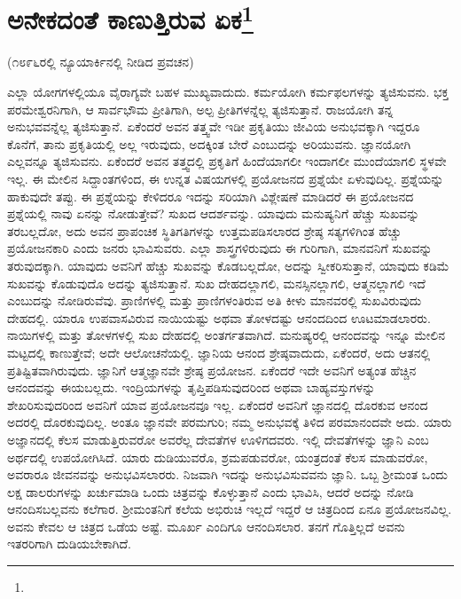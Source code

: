 
\chapter{ಅನೇಕದಂತೆ ಕಾಣುತ್ತಿರುವ ಏಕ\protect\footnote{}}

\begin{center}
(೧೮೯೬ರಲ್ಲಿ ನ್ಯೂಯಾರ್ಕಿನಲ್ಲಿ ನೀಡಿದ ಪ್ರವಚನ)
\end{center}

ಎಲ್ಲಾ ಯೋಗಗಳಲ್ಲಿಯೂ ವೈರಾಗ್ಯವೇ ಬಹಳ ಮುಖ್ಯವಾದುದು. ಕರ್ಮಯೋಗಿ ಕರ್ಮಫಲಗಳನ್ನು ತ್ಯಜಿಸುವನು. ಭಕ್ತ ಪರಮೇಶ್ವರನಿಗಾಗಿ, ಆ ಸಾರ್ವಭೌಮ ಪ್ರೀತಿಗಾಗಿ, ಅಲ್ಪ ಪ್ರೀತಿಗಳನ್ನೆಲ್ಲ ತ್ಯಜಿಸುತ್ತಾನೆ. ರಾಜಯೋಗಿ ತನ್ನ ಅನುಭವವನ್ನೆಲ್ಲ ತ್ಯಜಿಸುತ್ತಾನೆ. ಏಕೆಂದರೆ ಅವನ ತತ್ತ್ವವೇ ಇಡೀ ಪ್ರಕೃತಿಯು ಜೀವಿಯ ಅನುಭವಕ್ಕಾಗಿ ಇದ್ದರೂ ಕೊನೆಗೆ, ತಾನು ಪ್ರಕೃತಿಯಲ್ಲಿ ಅಲ್ಲ ಇರುವುದು, ಅದಕ್ಕಿಂತ ಬೇರೆ ಎಂಬುದನ್ನು ಅರಿಯುವನು. ಜ್ಞಾನಯೋಗಿ ಎಲ್ಲವನ್ನೂ ತ್ಯಜಿಸುವನು. ಏಕೆಂದರೆ ಅವನ ತತ್ತ್ವದಲ್ಲಿ ಪ್ರಕೃತಿಗೆ ಹಿಂದೆಯಾಗಲೀ ಇಂದಾಗಲೀ ಮುಂದೆಯಾಗಲಿ ಸ್ಥಳವೇ ಇಲ್ಲ. ಈ ಮೇಲಿನ ಸಿದ್ದಾಂತಗಳಿಂದ, ಈ ಉನ್ನತ ವಿಷಯಗಳಲ್ಲಿ ಪ್ರಯೋಜನದ ಪ್ರಶ್ನೆಯೇ ಏಳುವುದಿಲ್ಲ. ಪ್ರಶ್ನೆಯನ್ನು ಹಾಕುವುದೇ ತಪ್ಪು. ಈ ಪ್ರಶ್ನೆಯನ್ನು ಕೇಳಿದರೂ ಇದನ್ನು ಸರಿಯಾಗಿ ವಿಶ್ಲೇಷಣೆ ಮಾಡಿದರೆ ಈ ಪ್ರಯೋಜನದ ಪ್ರಶ್ನೆಯಲ್ಲಿ ನಾವು ಏನನ್ನು ನೋಡುತ್ತೇವೆ? ಸುಖದ ಆದರ್ಶವನ್ನು. ಯಾವುದು ಮನುಷ್ಯನಿಗೆ ಹೆಚ್ಚು ಸುಖವನ್ನು ತರಬಲ್ಲದೋ, ಅದು ಅವನ ಪ್ರಾಪಂಚಿಕ ಸ್ಥಿತಿಗತಿಗಳನ್ನು ಉತ್ತಮಪಡಿಸಲಾರದ ಶ್ರೇಷ್ಠ ಸತ್ಯಗಳಿಗಿಂತ ಹೆಚ್ಚು ಪ್ರಯೋಜನಕಾರಿ ಎಂದು ಜನರು ಭಾವಿಸುವರು. ಎಲ್ಲಾ ಶಾಸ್ತ್ರಗಳಿರುವುದು ಈ ಗುರಿಗಾಗಿ, ಮಾನವನಿಗೆ ಸುಖವನ್ನು ತರುವುದಕ್ಕಾಗಿ. ಯಾವುದು ಅವನಿಗೆ ಹೆಚ್ಚು ಸುಖವನ್ನು ಕೊಡಬಲ್ಲದೋ, ಅದನ್ನು ಸ್ವೀಕರಿಸುತ್ತಾನೆ, ಯಾವುದು ಕಡಿಮೆ ಸುಖವನ್ನು ಕೊಡುವುದೊ ಅದನ್ನು ತ್ಯಜಿಸುತ್ತಾನೆ. ಸುಖ ದೇಹದಲ್ಲಾಗಲಿ, ಮನಸ್ಸಿನಲ್ಲಾಗಲಿ, ಆತ್ಮನಲ್ಲಾಗಲಿ ಇದೆ ಎಂಬುದನ್ನು ನೋಡಿರುವೆವು. ಪ್ರಾಣಿಗಳಲ್ಲಿ ಮತ್ತು ಪ್ರಾಣಿಗಳಂತಿರುವ ಅತಿ ಕೀಳು ಮಾನವರಲ್ಲಿ ಸುಖವಿರುವುದು ದೇಹದಲ್ಲಿ. ಯಾರೂ ಉಪವಾಸವಿರುವ ನಾಯಿಯಷ್ಟು ಅಥವಾ ತೋಳದಷ್ಟು ಆನಂದದಿಂದ ಊಟಮಾಡಲಾರರು. ನಾಯಿಗಳಲ್ಲಿ ಮತ್ತು ತೋಳಗಳಲ್ಲಿ ಸುಖ ದೇಹದಲ್ಲಿ ಅಂತರ್ಗತವಾಗಿದೆ. ಮನುಷ್ಯರಲ್ಲಿ ಆನಂದವನ್ನು ಇನ್ನೂ ಮೇಲಿನ ಮಟ್ಟದಲ್ಲಿ ಕಾಣುತ್ತೇವೆ; ಅದೇ ಆಲೋಚನೆಯಲ್ಲಿ. ಜ್ಞಾನಿಯ ಆನಂದ ಶ್ರೇಷ್ಠವಾದುದು, ಏಕೆಂದರೆ, ಅದು ಆತನಲ್ಲಿ ಪ್ರತಿಷ್ಟಿತವಾಗಿರುವುದು. ಜ್ಞಾನಿಗೆ ಆತ್ಮಜ್ಞಾನವೇ ಶ್ರೇಷ್ಠ ಪ್ರಯೋಜನ. ಏಕೆಂದರೆ ಇದೇ ಅವನಿಗೆ ಅತ್ಯಂತ ಹೆಚ್ಚಿನ ಆನಂದವನ್ನು ಈಯಬಲ್ಲದು. ಇಂದ್ರಿಯಗಳನ್ನು ತೃಪ್ತಿಪಡಿಸುವುದರಿಂದ ಅಥವಾ ಬಾಹ್ಯವಸ್ತುಗಳನ್ನು ಶೇಖರಿಸುವುದರಿಂದ ಅವನಿಗೆ ಯಾವ ಪ್ರಯೋಜನವೂ ಇಲ್ಲ. ಏಕೆಂದರೆ ಅವನಿಗೆ ಜ್ಞಾನದಲ್ಲಿ ದೊರಕುವ ಆನಂದ ಅದರಲ್ಲಿ ದೊರಕುವುದಿಲ್ಲ. ಅಂತೂ ಜ್ಞಾನವೇ ಪರಮಗುರಿ; ನಮ್ಮ ಅನುಭವಕ್ಕೆ ತಿಳಿದ ಪರಮಾನಂದವೇ ಅದು. ಯಾರು ಅಜ್ಞಾನದಲ್ಲಿ ಕೆಲಸ ಮಾಡುತ್ತಿರುವರೋ ಅವರೆಲ್ಲ ದೇವತೆಗಳ ಊಳಿಗದವರು. ಇಲ್ಲಿ ದೇವತೆಗಳನ್ನು ಜ್ಞಾನಿ ಎಂಬ ಅರ್ಥದಲ್ಲಿ ಉಪಯೋಗಿಸಿದೆ. ಯಾರು ದುಡಿಯುವರೊ, ಶ್ರಮಪಡುವರೋ, ಯಂತ್ರದಂತೆ ಕೆಲಸ ಮಾಡುವರೋ, ಅವರಾರೂ ಜೀವನವನ್ನು ಅನುಭವಿಸಲಾರರು. ನಿಜವಾಗಿ ಇದನ್ನು ಅನುಭವಿಸುವವನು ಜ್ಞಾನಿ. ಒಬ್ಬ ಶ‍್ರೀಮಂತ ಒಂದು ಲಕ್ಷ ಡಾಲರುಗಳನ್ನು ಖರ್ಚುಮಾಡಿ ಒಂದು ಚಿತ್ರವನ್ನು ಕೊಳ್ಳುತ್ತಾನೆ ಎಂದು ಭಾವಿಸಿ, ಆದರೆ ಅದನ್ನು ನೋಡಿ ಆನಂದಿಸಬಲ್ಲವನು ಕಲೆಗಾರ. ಶ‍್ರೀಮಂತನಿಗೆ ಕಲೆಯ ಅಭಿರುಚಿ ಇಲ್ಲದೆ ಇದ್ದರೆ ಆ ಚಿತ್ರದಿಂದ ಏನೂ ಪ್ರಯೋಜನವಿಲ್ಲ. ಅವನು ಕೇವಲ ಆ ಚಿತ್ರದ ಒಡೆಯ ಅಷ್ಟೆ. ಮೂರ್ಖ ಎಂದಿಗೂ ಆನಂದಿಸಲಾರ. ತನಗೆ ಗೊತ್ತಿಲ್ಲದೆ ಅವನು ಇತರರಿಗಾಗಿ ದುಡಿಯಬೇಕಾಗಿದೆ.

